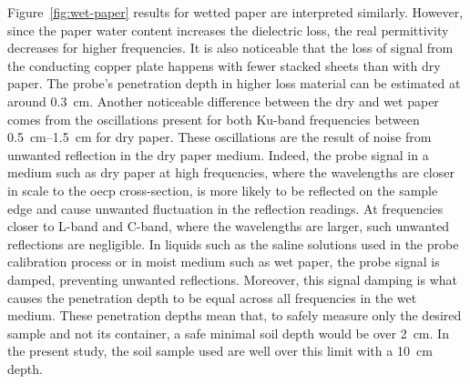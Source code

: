 Figure~\ref{fig:wet-paper} results for wetted paper are interpreted similarly.
However, since the paper water content increases the dielectric loss, the real permittivity decreases for higher frequencies.
It is also noticeable that the loss of signal from the conducting copper plate happens with fewer stacked sheets than with dry paper.
The probe's penetration depth in higher loss material can be estimated at around \qty{0.3}{\cm}.
Another noticeable difference between the dry and wet paper comes from the oscillations present for both Ku-band frequencies between \qtyrange{0.5}{1.5}{\cm} for dry paper.
These oscillations are the result of noise from unwanted reflection in the dry paper medium.
Indeed, the probe signal in a medium such as dry paper at high frequencies, where the wavelengths are closer in scale to the \ac{oecp} cross-section, is more likely to be reflected on the sample edge and cause unwanted fluctuation in the reflection readings.
At frequencies closer to L-band and C-band, where the wavelengths are larger, such unwanted reflections are negligible.
In liquids such as the saline solutions used in the probe calibration process or in moist medium such as wet paper, the probe signal is damped, preventing unwanted reflections.
Moreover, this signal damping is what causes the penetration depth to be equal across all frequencies in the wet medium. 
These penetration depths mean that, to safely measure only the desired sample and not its container, a safe minimal soil depth would be over \qty{2}{\cm}.
In the present study, the soil sample used are well over this limit with a \qty{10}{\cm} depth.



